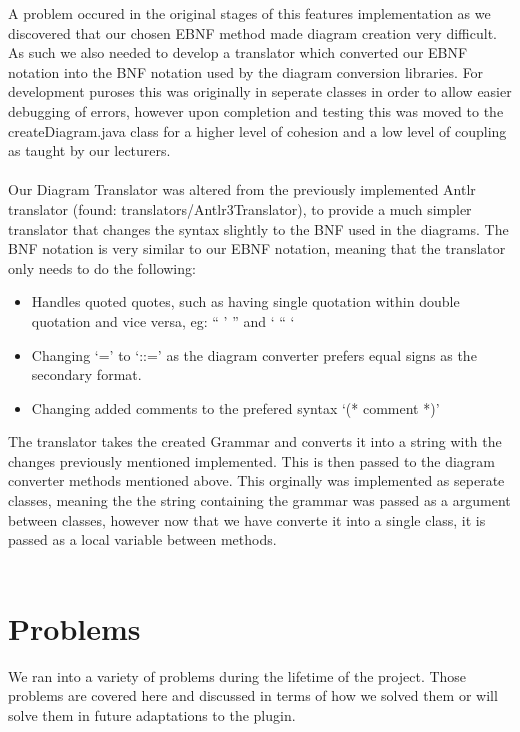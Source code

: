 A problem occured in the original stages of this features implementation as we discovered that our chosen EBNF method made diagram creation very difficult. As such we also needed to develop a translator which converted our EBNF notation into the BNF notation used by the diagram conversion libraries. For development puroses this was originally in seperate classes in order to allow easier debugging of errors, however upon completion and testing this was moved to the createDiagram.java class for a higher level of cohesion and a low level of coupling as taught by our lecturers. \\
\\
Our Diagram Translator was altered from the previously implemented Antlr translator (found: translators/Antlr3Translator), to provide a much simpler translator that changes the syntax slightly to the BNF used in the diagrams. The BNF notation is very similar to our EBNF notation, meaning that the translator only needs to do the following:
\begin{itemize}
\item Handles quoted quotes, such as having single quotation within double quotation and vice versa, eg: “ ’ ” and ‘ “ ‘ 
\item Changing ‘=’ to ‘::=’ as the diagram converter prefers equal signs as the secondary format.
\item Changing added comments to the prefered syntax ‘(* comment *)’ 
\end{itemize}
The translator takes the created Grammar and converts it into a string with the changes previously mentioned implemented. This is then passed to the diagram converter methods mentioned above. This orginally was implemented as seperate classes, meaning the the string containing the grammar was passed as a argument between classes, however now that we have converte it into a single class, it is passed as a local variable between methods. \\
\\
\section{Problems}
We ran into a variety of problems during the lifetime of the project. Those problems are covered here and discussed in terms of how we solved them or will solve them in future adaptations to the plugin. 

